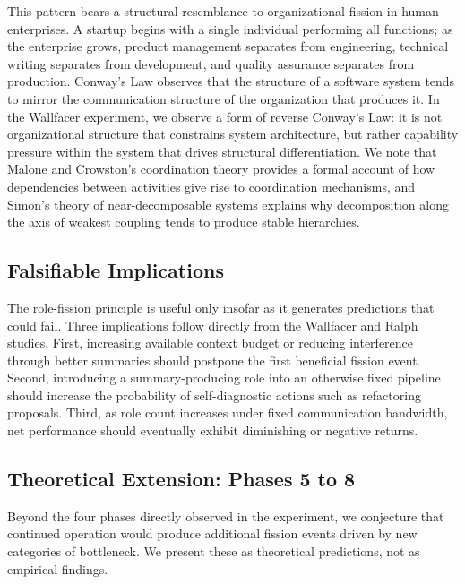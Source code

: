 This pattern bears a structural resemblance to organizational fission in human enterprises. A startup begins with a single individual performing all functions; as the enterprise grows, product management separates from engineering, technical writing separates from development, and quality assurance separates from production. Conway's Law \cite{conway1968} observes that the structure of a software system tends to mirror the communication structure of the organization that produces it. In the Wallfacer experiment, we observe a form of reverse Conway's Law: it is not organizational structure that constrains system architecture, but rather capability pressure within the system that drives structural differentiation. We note that Malone and Crowston's \cite{malone1994} coordination theory provides a formal account of how dependencies between activities give rise to coordination mechanisms, and Simon's \cite{simon1962} theory of near-decomposable systems explains why decomposition along the axis of weakest coupling tends to produce stable hierarchies.

\subsection{Falsifiable Implications}

The role-fission principle is useful only insofar as it generates predictions that could fail. Three implications follow directly from the Wallfacer and Ralph studies. First, increasing available context budget or reducing interference through better summaries should postpone the first beneficial fission event. Second, introducing a summary-producing role into an otherwise fixed pipeline should increase the probability of self-diagnostic actions such as refactoring proposals. Third, as role count increases under fixed communication bandwidth, net performance should eventually exhibit diminishing or negative returns.


\subsection{Theoretical Extension: Phases 5 to 8}

Beyond the four phases directly observed in the experiment, we conjecture that continued operation would produce additional fission events driven by new categories of bottleneck. We present these as theoretical predictions, not as empirical findings.

